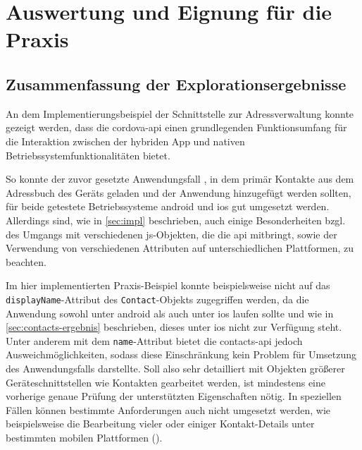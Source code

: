 \chapter{Auswertung und Eignung für die Praxis} %


\section{Zusammenfassung der Explorationsergebnisse}

An dem Implementierungsbeispiel der Schnittstelle zur Adressverwaltung konnte gezeigt werden, dass die \gls{cordova}-\gls{api} einen grundlegenden Funktionsumfang für die Interaktion zwischen der hybriden App und nativen Betriebssystemfunktionalitäten bietet.	%

So konnte der zuvor gesetzte Anwendungsfall , in dem primär Kontakte aus dem Adressbuch des Geräts geladen und der Anwendung hinzugefügt werden sollten, für beide getestete Betriebssysteme \gls{android} und \gls{ios} gut umgesetzt werden. 
Allerdings sind, wie in \autoref{sec:impl} beschrieben, auch einige Besonderheiten bzgl. des Umgangs mit verschiedenen \gls{js}-Objekten, die die \gls{api} mitbringt, sowie der Verwendung von verschiedenen Attributen auf unterschiedlichen Plattformen, zu beachten.

Im hier implementierten Praxis-Beispiel konnte beispielsweise nicht auf das \lstinline|displayName|-Attribut des \lstinline|Contact|-Objekts zugegriffen werden, da die Anwendung sowohl unter \gls{android} als auch unter \gls{ios} laufen sollte und wie in \autoref{sec:contacts-ergebnis} beschrieben, dieses unter \gls{ios} nicht zur Verfügung steht. Unter anderem mit dem \lstinline|name|-Attribut bietet die contacts-api jedoch Ausweichmöglichkeiten, sodass diese Einschränkung kein Problem für Umsetzung des Anwendungsfalls darstellte.
Soll also sehr detailliert mit Objekten größerer Geräteschnittstellen wie \zB Kontakten gearbeitet werden, ist mindestens eine vorherige genaue Prüfung der unterstützten Eigenschaften nötig. In speziellen Fällen können bestimmte Anforderungen auch nicht umgesetzt werden, wie beispielsweise die Bearbeitung vieler oder einiger Kontakt-Details unter bestimmten mobilen Plattformen ().

